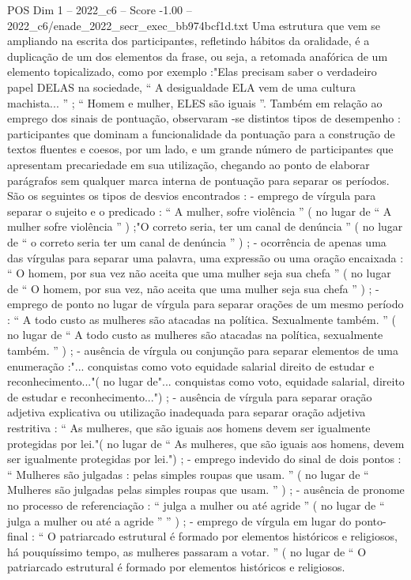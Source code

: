 \begin{textsample}{POS Dim 1 – 2022\_c6 – Score -1.00 – 2022\_c6/enade\_2022\_secr\_exec\_bb974bcf1d.txt}
Uma estrutura que vem se ampliando na escrita dos participantes, refletindo hábitos da oralidade, é a duplicação de um dos elementos da frase, ou seja, a retomada anafórica de um elemento topicalizado, como por exemplo :"Elas precisam saber o verdadeiro papel DELAS na sociedade, “ A desigualdade ELA vem de uma cultura machista... ” ; “ Homem e mulher, ELES são iguais ”.
Também em relação ao emprego dos sinais de pontuação, observaram -se distintos tipos de desempenho : participantes que dominam a funcionalidade da pontuação para a construção de textos fluentes e coesos, por um lado, e um grande número de participantes que apresentam precariedade em sua utilização, chegando ao ponto de elaborar parágrafos sem qualquer marca interna de pontuação para separar os períodos.
São os seguintes os tipos de desvios encontrados : - emprego de vírgula para separar o sujeito e o predicado : “ A mulher, sofre violência ” ( no lugar de “ A mulher sofre violência ” ) ;"O correto seria, ter um canal de denúncia ” ( no lugar de “ o correto seria ter um canal de denúncia ” ) ; - ocorrência de apenas uma das vírgulas para separar uma palavra, uma expressão ou uma oração encaixada : “ O homem, por sua vez não aceita que uma mulher seja sua chefa ” ( no lugar de “ O homem, por sua vez, não aceita que uma mulher seja sua chefa ” ) ; - emprego de ponto no lugar de vírgula para separar orações de um mesmo período : “ A todo custo as mulheres são atacadas na política.
Sexualmente também. ” ( no lugar de “ A todo custo as mulheres são atacadas na política, sexualmente também. ” ) ; - ausência de vírgula ou conjunção para separar elementos de uma enumeração :"... conquistas como voto equidade salarial direito de estudar e reconhecimento..."( no lugar de"... conquistas como voto, equidade salarial, direito de estudar e reconhecimento...") ; - ausência de vírgula para separar oração adjetiva explicativa ou utilização inadequada para separar oração adjetiva restritiva : “ As mulheres, que são iguais aos homens devem ser igualmente protegidas por lei."( no lugar de “ As mulheres, que são iguais aos homens, devem ser igualmente protegidas por lei.") ; - emprego indevido do sinal de dois pontos : “ Mulheres são julgadas : pelas simples roupas que usam. ” ( no lugar de “ Mulheres são julgadas pelas simples roupas que usam. ” ) ; - ausência de pronome no processo de referenciação : “ julga a mulher ou até agride ” ( no lugar de “ julga a mulher ou até a agride ” ” ) ; - emprego de vírgula em lugar do ponto-final : “ O patriarcado estrutural é formado por elementos históricos e religiosos, há pouquíssimo tempo, as mulheres passaram a votar. ” ( no lugar de “ O patriarcado estrutural é formado por elementos históricos e religiosos.

\end{textsample}
